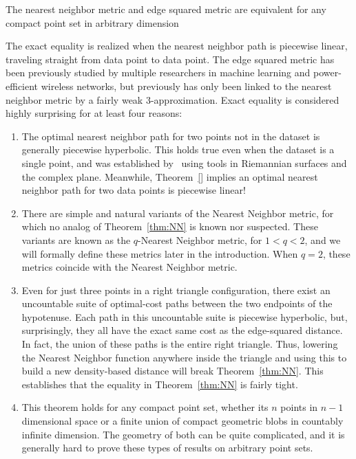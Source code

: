 \begin{theorem}\label{thm:NN} The nearest neighbor metric and edge squared
metric are equivalent for any compact point set in arbitrary dimension
\end{theorem}

The exact equality is realized when the nearest neighbor path is piecewise
linear, traveling straight from data point to data point. The edge squared
metric has been previously studied by multiple researchers in machine
learning and power-efficient wireless networks, but previously has only
been linked to the nearest neighbor metric by a fairly weak
3-approximation. Exact equality is considered highly surprising for at
least four reasons:

\begin{enumerate}

\item The optimal nearest neighbor path for two points not in the dataset
	is generally piecewise hyperbolic. This holds true even when the
		dataset is a single point, and was established by~\cite{}
		using tools in Riemannian surfaces and the complex plane.
		Meanwhile, Theorem~\ref{} implies an optimal nearest
		neighbor path for two data points is piecewise linear!

\item There are simple and natural variants of the Nearest Neighbor metric,
	for which no analog of Theorem~\ref{thm:NN} is known nor suspected.
		These variants are known as the $q$-Nearest Neighbor
		metric, for $1 < q < 2$, and we will formally define these
		metrics later in the introduction. When $q=2$, these
		metrics coincide with the Nearest Neighbor metric.

\item Even for just three points in a right triangle configuration, there
	exist an uncountable suite of optimal-cost paths between the two
		endpoints of the hypotenuse. Each path in this uncountable
		suite is piecewise hyperbolic, but, surprisingly, they all
		have the exact same cost as the edge-squared distance. In
		fact, the union of these paths is the entire right
		triangle. Thus, lowering the Nearest Neighbor function
		anywhere inside the triangle and using this to build a new
density-based distance will break
		Theorem~\ref{thm:NN}. This establishes that the equality in
		Theorem~\ref{thm:NN} is fairly tight.

\item This theorem holds for any compact point set, whether its $n$ points
	in $n-1$ dimensional space or a finite union of compact geometric
		blobs in countably infinite dimension. The geometry of both
		can be quite complicated, and it is generally hard to prove
		these types of results on arbitrary point sets.

\end{enumerate}

